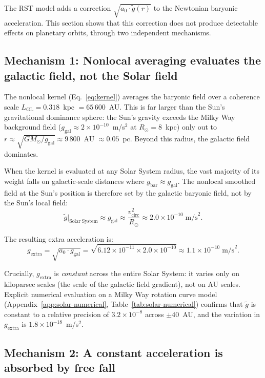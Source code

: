 \documentclass[11pt,a4paper]{article}
\begin{document}
The RST model adds a correction $\sqrt{a_0 \cdot \tilde{g}(r)}$ to the Newtonian baryonic acceleration.
This section shows that this correction does not produce detectable effects on planetary orbits, through two independent mechanisms.

\subsection{Mechanism 1: Nonlocal averaging evaluates the galactic field, not the Solar field}

The nonlocal kernel (Eq.~\ref{eq:kernel}) averages the baryonic field over a coherence scale $L_{\mathrm{GL}} = 0.318$~kpc $= 65\,600$~AU.
This is far larger than the Sun's gravitational dominance sphere: the Sun's gravity exceeds the Milky Way background field ($g_{\mathrm{gal}} \approx 2 \times 10^{-10}$~m/s$^2$ at $R_\odot = 8$~kpc) only out to $r \approx \sqrt{GM_\odot / g_{\mathrm{gal}}} \approx 9\,800$~AU $\approx 0.05$~pc.
Beyond this radius, the galactic field dominates.

When the kernel is evaluated at any Solar System radius, the vast majority of its weight falls on galactic-scale distances where $g_{\mathrm{bar}} \approx g_{\mathrm{gal}}$.
The nonlocal smoothed field at the Sun's position is therefore set by the galactic baryonic field, not by the Sun's local field:
\begin{equation}
\tilde{g}\big|_{\mathrm{Solar\;System}} \approx g_{\mathrm{gal}} \approx \frac{v_{\mathrm{circ}}^2}{R_\odot} \approx 2.0 \times 10^{-10} \;\text{m/s}^2.
\end{equation}

The resulting extra acceleration is:
\begin{equation}
g_{\mathrm{extra}} = \sqrt{a_0 \cdot g_{\mathrm{gal}}} = \sqrt{6.12 \times 10^{-11} \times 2.0 \times 10^{-10}} \approx 1.1 \times 10^{-10} \;\text{m/s}^2.
\end{equation}

Crucially, $g_{\mathrm{extra}}$ is \textit{constant} across the entire Solar System: it varies only on kiloparsec scales (the scale of the galactic field gradient), not on AU scales.
Explicit numerical evaluation on a Milky Way rotation curve model (Appendix~\ref{app:solar-numerical}, Table~\ref{tab:solar-numerical}) confirms that $\tilde{g}$ is constant to a relative precision of $3.2 \times 10^{-8}$ across $\pm 40$~AU, and the variation in $g_{\mathrm{extra}}$ is $1.8 \times 10^{-18}$~m/s$^2$.

\subsection{Mechanism 2: A constant acceleration is absorbed by free fall}
\end{document}
